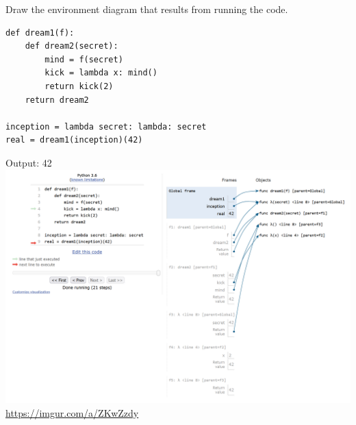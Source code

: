 \begin{blocksection}
\question Draw the environment diagram that results from running the code.

\begin{lstlisting}
def dream1(f):
    def dream2(secret):
        mind = f(secret)
        kick = lambda x: mind()
        return kick(2)
    return dream2

inception = lambda secret: lambda: secret
real = dream1(inception)(42)
\end{lstlisting}

\pagebreak

\begin{solution}[2in]
Output: 42 \newline
\includegraphics[scale=0.5]{newNewInception.png}
\newline
\url{https://imgur.com/a/ZKwZzdy}
\end{solution}
\end{blocksection}
